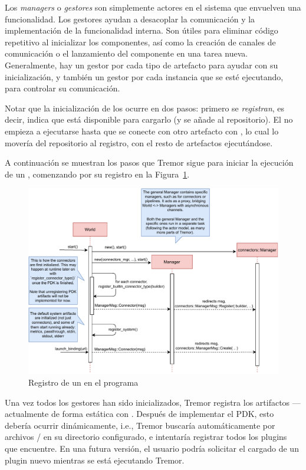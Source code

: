 Los \emph{managers} o \emph{gestores} son simplemente actores en el sistema que
envuelven una funcionalidad. Los gestores ayudan a desacoplar la comunicación y
la implementación de la funcionalidad interna. Son útiles para eliminar código
repetitivo al inicializar los componentes, así como la creación de canales de
comunicación o el lanzamiento del componente en una tarea nueva. Generalmente,
hay un gestor por cada tipo de artefacto para ayudar con su inicialización, y
también un gestor por cada instancia que se esté ejecutando, para controlar su
comunicación.

Notar que la inicialización de los \connectors ocurre en dos pasos: primero se
\emph{registran}, es decir, indica que está disponible para cargarlo (y se añade
al repositorio). El \connector no empieza a ejecutarse hasta que se conecte con
otro artefacto con , lo cual lo movería del repositorio al
registro, con el resto de artefactos ejecutándose.

A continuación se muestran los pasos que Tremor sigue para iniciar la ejecución
de un \connector, comenzando por su registro en la
Figura~\ref{fig:tremor_registering}.

\begin{figure}
    \centering
    \includegraphics[width=\textwidth]{./Imagenes/registering.pdf}
    \caption{Registro de un \connector en el programa}%
    \label{fig:tremor_registering}
\end{figure}

Una vez todos los gestores han sido inicializados, Tremor registra los
artifactos --- actualmente de forma estática con .
Después de implementar el PDK, esto debería ocurrir dinámicamente, i.e., Tremor
buscaría automáticamente por archivos / en su directorio
configurado, e intentaría registrar todos los plugins que encuentre. En una
futura versión, el usuario podría solicitar el cargado de un plugin nuevo
mientras se está ejecutando Tremor.

